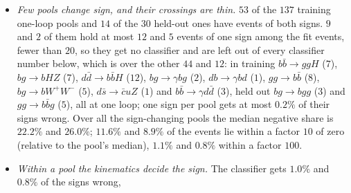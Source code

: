 \documentclass[11pt]{article}
\begin{document}
\begin{itemize}
  \item \emph{Few pools change sign, and their crossings are thin.} $53$ of the $137$ training one-loop pools and $14$
    of the $30$ held-out ones have events of both signs. $9$ and $2$ of them hold at most $12$ and $5$ events of one
    sign among the fit events, fewer than $20$, so they get no classifier and are left out of every classifier number
    below, which is over the other $44$ and $12$: in training $b\bar b\to ggH$ ($7$), $bg\to bHZ$ ($7$), $d\bar d\to
    b\bar bH$ ($12$), $bg\to\gamma bg$ ($2$), $db\to\gamma bd$ ($1$), $gg\to b\bar b$ ($8$), $bg\to bW^+W^-$ ($5$),
    $d\bar s\to\bar cuZ$ ($1$) and $b\bar b\to\gamma d\bar d$ ($3$), held out $bg\to bgg$ ($3$) and $gg\to b\bar bg$
    ($5$), all at one loop; one sign per pool gets at most $0.2\%$ of their signs wrong. Over all the sign-changing
    pools the median negative share is $22.2\%$ and $26.0\%$; $11.6\%$ and $8.9\%$ of the events lie within a
    factor $10$ of zero (relative to the pool's median), $1.1\%$ and $0.8\%$ within a factor $100$.
  \item \emph{Within a pool the kinematics decide the sign.} The classifier gets $1.0\%$ and $0.8\%$ of the signs wrong,

\end{itemize}
\end{document}
